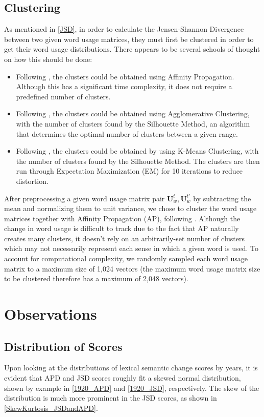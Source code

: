 \documentclass[10pt, a4paper]{article}
\begin{document}
\subsection{Clustering}
\label{clustering}
As mentioned in \ref{JSD}, in order to calculate the Jensen-Shannon Divergence between two given word usage matrices, they must first be clustered in order to get their word usage distributions. There appears to be several schools of thought on how this should be done:
\begin{itemize}
    \item{Following \cite{Martinc2020,Kutuzov2020}, the clusters could be obtained using Affinity Propagation. Although this has a significant time complexity, it does not require a predefined number of clusters.}
    \item{Following \cite{Laicher2021}, the clusters could be obtained using Agglomerative Clustering, with the number of clusters found by the Silhouette Method\cite{silhouette}, an algorithm that determines the optimal number of clusters between a given range.}
    \item{Following \cite{Giulianelli2020}, the clusters could be obtained by using K-Means Clustering, with the number of clusters found by the Silhouette Method. The clusters are then run through Expectation Maximization (EM) for 10 iterations to reduce distortion.}
\end{itemize}

After preprocessing a given word usage matrix pair $\textbf{U}^{t}_w, \textbf{U}^{t'}_w$ by subtracting the mean and normalizing them to unit variance, we chose to cluster the word usage matrices together with Affinity Propagation (AP), following \cite{Martinc2020,Kutuzov2020}. Although the change in word usage is difficult to track due to the fact that AP naturally creates many clusters, it doesn't rely on an arbitrarily-set number of clusters which may not necessarily represent each sense in which a given word is used. To account for computational complexity, we randomly sampled each word usage matrix to a maximum size of 1,024 vectors (the maximum word usage matrix size to be clustered therefore has a maximum of 2,048 vectors).

\section{Observations}
\subsection{Distribution of Scores}
Upon looking at the distributions of lexical semantic change scores by years, it is evident that APD and JSD scores roughly fit a skewed normal distribution, shown by example in \ref{1920_APD} and \ref{1920_JSD}, respectively. The skew of the distribution is much more prominent in the JSD scores, as shown in \ref{SkewKurtosis_JSDandAPD}.
\end{document}
